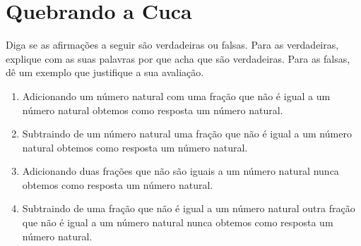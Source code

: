 \section{Quebrando a Cuca}


\begin{atividade}{}\label{chap5-ativ15}

Diga se as afirmações a seguir são verdadeiras ou falsas. Para as verdadeiras, explique com as suas palavras por que acha que são verdadeiras. Para as falsas, dê um exemplo que justifique a sua avaliação.
\begin{enumerate}  %
  \item     Adicionando um número natural com uma fração que não é igual a um número natural obtemos como resposta um número natural.
  \item     Subtraindo de  um número natural  uma fração que não é igual a um número natural obtemos como resposta um número natural. 
  \item     Adicionando duas frações que não são iguais a um número natural nunca obtemos como resposta um número natural.
  \item     Subtraindo de uma fração que não é igual a um número natural outra fração que não é igual a um número natural nunca obtemos como resposta um número natural. 
\end{enumerate} %
\end{atividade}


